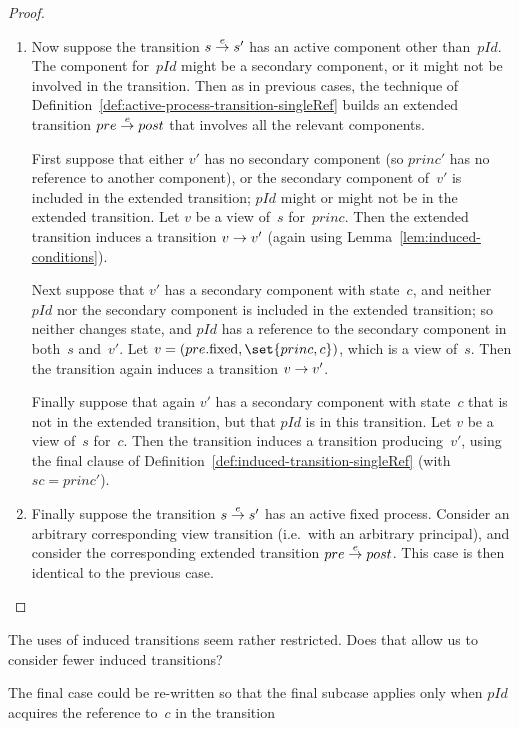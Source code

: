 \begin{proof}
\begin{enumerate}
\item %
Now suppose the transition $s \stackrel{e}\rightarrow s'$ has an active component other
than~$pId$.  The component for~$pId$ might be a secondary component, or it
might not be involved in the transition.  Then as in previous cases, the
technique of Definition~\ref{def:active-process-transition-singleRef} builds
an extended transition \( pre \stackrel{e}\rightarrow post \) that involves all the relevant
components.

First suppose that either $v'$ has no secondary component (so $princ'$ has no
reference to another component), or the secondary component of~$v'$ is
included in the extended transition; $pId$ might or might not be in the
extended transition.  Let $v$ be a view of~$s$ for~$princ$.  Then the extended
transition induces a transition $v \stackrel{}\rightarrow v'$ (again using
Lemma~\ref{lem:induced-conditions}).

Next suppose that $v'$ has a secondary component with state~$c$, and neither
$pId$ nor the secondary component is included in the extended transition; so
neither changes state, and $pId$ has a reference to the secondary component in
both~$s$ and~$v'$.  Let $v = (pre.\fixed, \set{princ, c})$, which is a view
of~$s$.  Then the transition again induces a transition $v \stackrel{}\rightarrow v'$.

Finally suppose that again $v'$ has a secondary component with state~$c$ that
is not in the extended transition, but that $pId$ is in this transition.  Let
$v$ be a view of~$s$ for~$c$.  Then the transition induces a transition
producing~$v'$, using the final clause of
Definition~\ref{def:induced-transition-singleRef} (with $sc = princ'$).


\item
Finally suppose the transition $s \stackrel{e}\rightarrow s'$ has an active fixed process.
Consider an arbitrary corresponding view transition (i.e.~with an arbitrary
principal), and consider the corresponding extended transition $pre \stackrel{e}\rightarrow
post$.  This case is then identical to the previous case.
\end{enumerate}

\end{proof}


\begin{improve}
The uses of induced transitions seem rather restricted.  Does that allow us to
consider fewer induced transitions?  

The final case could be re-written so that the final subcase applies only when
$pId$ acquires the reference to~$c$ in the transition
\end{improve}



